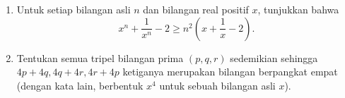 \documentclass[a4paper,12pt]{article}
\begin{document}
\begin{enumerate}
\item Untuk setiap bilangan asli $n$ dan bilangan real positif $x$, tunjukkan bahwa \[x^n+\dfrac{1}{x^n}-2 \ge n^2 \left(x+\frac{1}{x}-2\right).\]

\item Tentukan semua tripel bilangan prima $(p,q,r)$ sedemikian sehingga $4p+4q,4q+4r,4r+4p$ ketiganya merupakan bilangan berpangkat empat (dengan kata lain, berbentuk $x^4$ untuk sebuah bilangan asli $x$).
\end{enumerate}
\end{document}
